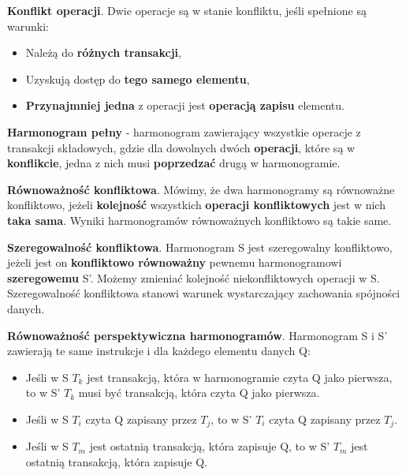 \documentclass[12pt]{article}
\begin{document}
    \begin{definition}
        \textbf{Konflikt operacji}. Dwie operacje są w stanie konfliktu, jeśli spełnione są warunki:
        \begin{itemize}
            \item Należą do \textbf{różnych transakcji},
            \item Uzyskują dostęp do \textbf{tego samego elementu},
            \item \textbf{Przynajmniej jedna} z operacji jest \textbf{operacją zapisu} elementu.
        \end{itemize}
    \end{definition}

    \begin{definition}
        \textbf{Harmonogram pełny} - harmonogram zawierający wszystkie operacje z transakcji składowych, gdzie dla
        dowolnych dwóch \textbf{operacji}, które są w \textbf{konflikcie}, jedna z nich musi \textbf{poprzedzać} drugą
        w harmonogramie.
    \end{definition}

    \begin{definition}
        \textbf{Równoważność konfliktowa}. Mówimy, że dwa harmonogramy są równoważne konfliktowo, jeżeli
        \textbf{kolejność} wszystkich \textbf{operacji konfliktowych} jest w nich \textbf{taka sama}. Wyniki
        harmonogramów równoważnych konfliktowo są takie same.
    \end{definition}

    \begin{definition}
        \textbf{Szeregowalność konfliktowa}. Harmonogram S jest szeregowalny konfliktowo, jeżeli jest on
        \textbf{konfliktowo równoważny} pewnemu harmonogramowi \textbf{szeregowemu} S’. Możemy zmieniać kolejność
        niekonfliktowych operacji w S.\\

        Szeregowalność konfliktowa stanowi warunek wystarczający zachowania spójności danych.
    \end{definition}

    \begin{definition}
        \textbf{Równoważność perspektywiczna harmonogramów}. Harmonogram S i S' zawierają te same instrukcje i dla każdego
        elementu danych Q:
        \begin{itemize}
            \item Jeśli w S $T_k$ jest transakcją, która w
            harmonogramie czyta Q jako pierwsza, to w S' $T_k$ musi być transakcją, która czyta Q jako pierwsza.
            \item Jeśli w S $T_i$ czyta Q zapisany przez $T_j$, to w S' $T_i$ czyta Q zapisany przez $T_j$.
            \item Jeśli w S  $T_m$ jest ostatnią transakcją, która
            zapisuje Q, to w S' $T_m$ jest ostatnią transakcją, która zapisuje Q.
        \end{itemize}
    \end{definition}
\end{document}
